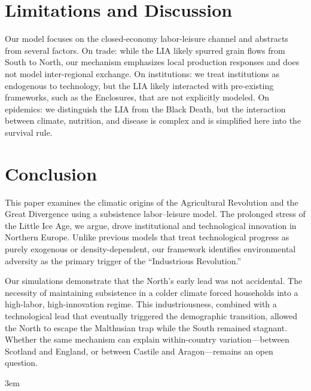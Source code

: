 \documentclass[11pt,a4paper]{article}
\begin{document}
\section{Limitations and Discussion}
Our model focuses on the closed-economy labor-leisure channel and abstracts from several factors. On trade: while the LIA likely spurred grain flows from South to North, our mechanism emphasizes local production responses and does not model inter-regional exchange. On institutions: we treat institutions as endogenous to technology, but the LIA likely interacted with pre-existing frameworks, such as the Enclosures, that are not explicitly modeled. On epidemics: we distinguish the LIA from the Black Death, but the interaction between climate, nutrition, and disease is complex and is simplified here into the survival rule.

\section{Conclusion}

This paper examines the climatic origins of the Agricultural Revolution and the Great Divergence using a subsistence labor--leisure model. The prolonged stress of the Little Ice Age, we argue, drove institutional and technological innovation in Northern Europe. Unlike previous models that treat technological progress as purely exogenous or density-dependent, our framework identifies environmental adversity as the primary trigger of the ``Industrious Revolution.''

Our simulations demonstrate that the North's early lead was not accidental. The necessity of maintaining subsistence in a colder climate forced households into a high-labor, high-innovation regime. This industriousness, combined with a technological lead that eventually triggered the demographic transition, allowed the North to escape the Malthusian trap while the South remained stagnant. Whether the same mechanism can explain within-country variation---between Scotland and England, or between Castile and Aragon---remains an open question.

\emergencystretch 3em
\printbibliography
\end{document}
